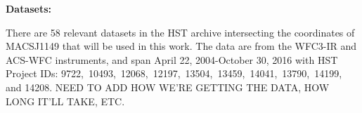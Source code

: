 \textbf{Datasets:}

There are 58 relevant datasets in the HST archive intersecting the coordinates of MACSJ1149 that 
will be used in this work. The data are from the WFC3-IR and ACS-WFC instruments, and span 
April 22, 2004-October 30, 2016 with HST Project IDs: 9722,\ 10493,\ 12068,\ 12197,\ 13504,\
13459,\ 14041,\  13790,\ 14199, and 14208. NEED TO ADD HOW WE'RE GETTING THE DATA,
HOW LONG IT'LL TAKE, ETC.




